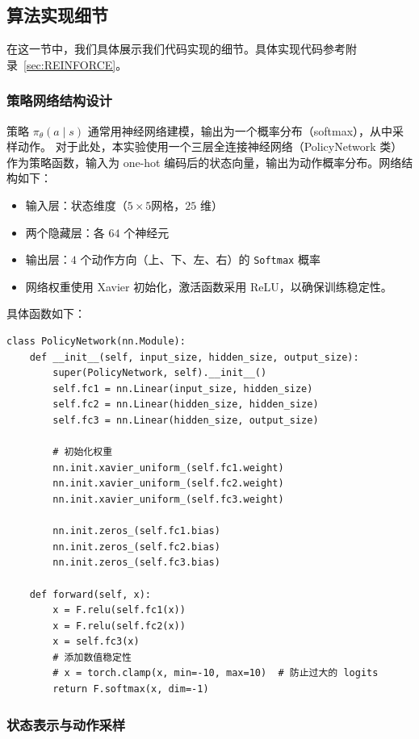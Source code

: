 \subsection{算法实现细节}

在这一节中，我们具体展示我们代码实现的细节。具体实现代码参考附录~\ref{sec:REINFORCE}。

\subsubsection{策略网络结构设计}

策略 \(\pi_\theta \left( a \mid s\right)\) 通常用神经网络建模，输出为一个概率分布（softmax），从中采样动作。
对于此处，本实验使用一个三层全连接神经网络（\textsf{PolicyNetwork} 类）作为策略函数，输入为 one-hot 编码后的状态向量，输出为动作概率分布。网络结构如下：
\begin{itemize}
    \item 输入层：状态维度（\(5 \times 5\)网格，\(25\) 维）
    \item 两个隐藏层：各 \(64\) 个神经元
    \item 输出层：\(4\) 个动作方向（上、下、左、右）的 \texttt{Softmax} 概率
    \item 网络权重使用 Xavier 初始化，激活函数采用 ReLU，以确保训练稳定性。
\end{itemize}
具体函数如下：
\begin{verbatim}
class PolicyNetwork(nn.Module):
    def __init__(self, input_size, hidden_size, output_size):
        super(PolicyNetwork, self).__init__()
        self.fc1 = nn.Linear(input_size, hidden_size)
        self.fc2 = nn.Linear(hidden_size, hidden_size)
        self.fc3 = nn.Linear(hidden_size, output_size)

        # 初始化权重
        nn.init.xavier_uniform_(self.fc1.weight)
        nn.init.xavier_uniform_(self.fc2.weight)
        nn.init.xavier_uniform_(self.fc3.weight)

        nn.init.zeros_(self.fc1.bias)
        nn.init.zeros_(self.fc2.bias)
        nn.init.zeros_(self.fc3.bias)

    def forward(self, x):
        x = F.relu(self.fc1(x))
        x = F.relu(self.fc2(x))
        x = self.fc3(x)
        # 添加数值稳定性
        # x = torch.clamp(x, min=-10, max=10)  # 防止过大的 logits
        return F.softmax(x, dim=-1)
\end{verbatim}

\subsubsection{状态表示与动作采样}\label{subsubsec:REINFORCE-state-action}

